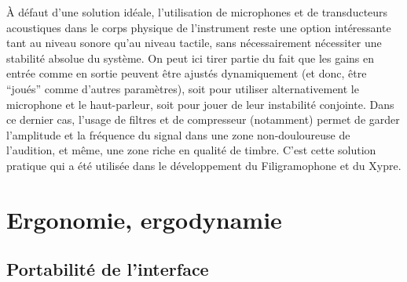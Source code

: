 \indent À défaut d'une solution idéale, l'utilisation de microphones et de transducteurs acoustiques dans le corps physique de l'instrument reste une option intéressante tant au niveau sonore qu'au niveau tactile, sans nécessairement nécessiter une stabilité absolue du système. On peut ici tirer partie du fait que les gains en entrée comme en sortie peuvent être ajustés dynamiquement (et donc, être ``joués'' comme d'autres paramètres), soit pour utiliser alternativement le microphone et le haut-parleur, soit pour jouer de leur instabilité conjointe. Dans ce dernier cas, l'usage de filtres et de compresseur (notamment) permet de garder l'amplitude et la fréquence du signal dans une zone non-douloureuse de l'audition, et même, une zone riche en qualité de timbre. C'est cette solution pratique qui a été utilisée dans le développement du Filigramophone et du Xypre.


\section{Ergonomie, ergodynamie}
\label{sec:interfaces:ergonomy}

\subsection{Portabilité de l'interface}
\label{sec:interfaces:ergonomy:portability}

